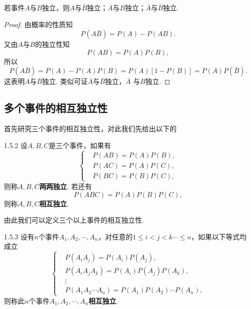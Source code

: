 \begin{property}\label{prop1.5.1}
  若事件$A$与$B$独立，则$A$与$\bar B$独立；$\bar A$与$B$独立；$\bar A$与$\bar B$独立.
\end{property}
\begin{proof}
  由概率的性质知
  \[
    P(A\bar B) = P(A) - P(AB).
  \]
  又由$A$与$B$的独立性知
  \[
    P(AB) = P(A)P(B),
  \]
  所以
  \[
    P(A\bar B) = P(A) - P(A)P(B) = P(A) [1 - P(B)] = P(A)P(\bar B).
  \]
  这表明$A$与$\bar B$独立. 类似可证$\bar A$与$\bar B$独立，$\bar A$ 与$B$独立.
\end{proof}

\subsection{多个事件的相互独立性}
首先研究三个事件的相互独立性，对此我们先给出以下的
\begin{definition}{}{1.5.2}
  设$A,B,C$是三个事件，如果有
  \begin{equation}\label{eq1.5.2}
    \left\{
      \begin{aligned}
        & P(AB) = P(A) P(B), \\
        & P(AC) = P(A) P(C), \\
        & P(BC) = P(B) P(C),
      \end{aligned}
    \right.
  \end{equation}
  则称$A,B,C$\textbf{两两独立}. 若还有
  \begin{equation}\label{eq1.5.3}
    P(ABC) = P(A) P(B) P(C),
  \end{equation}
  则称$A,B,C$\textbf{相互独立}.
\end{definition}

由此我们可以定义三个以上事件的相互独立性.
\begin{definition}{}{1.5.3}
  设有$n$个事件$A_1,A_2,\cdots,A_n$，对任意的$1\le i<j<k\cdots\le n$，如果以下等式均成立
  \begin{equation}\label{eq1.5.4}
    \left\{
      \begin{aligned}
        & P(A_iA_j) = P(A_i) P(A_j), \\
        & P(A_iA_jA_k) = P(A_i) P(A_j) P(A_k), \\
        & \vdots \\
        & P(A_1A_2\cdots A_n) = P(A_1)P(A_2) \cdots P(A_n),
      \end{aligned}
    \right.
  \end{equation}
  则称此$n$个事件$A_1,A_2,\cdots,A_n$\textbf{相互独立}.
\end{definition}

